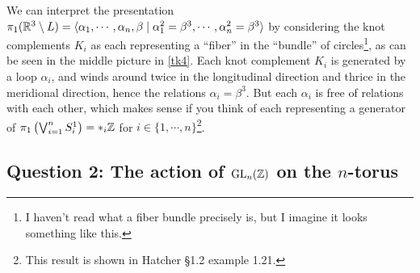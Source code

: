 \begin{solution}
We can interpret the presentation $\pi_1(\mathbb{R}^3 \setminus L)=\langle \alpha_1,\cdots ,\alpha _n  ,\beta \mid  \alpha_1^2=\beta ^3,\cdots ,\alpha _n ^2=\beta ^3\rangle $ by considering the knot complements $K_i $ as each representing a ``fiber'' in the ``bundle'' of circles\footnote{I haven't read what a fiber bundle precisely is, but I imagine it looks something like this.}, as can be seen in the middle picture in \cref{tk4}. Each knot complement $K_i $ is generated by a loop $\alpha _i $, and winds around twice in the longitudinal direction and thrice in the meridional direction, hence the relations $\alpha _i =\beta ^3$. But each $\alpha _i $ is free of relations with each other, which makes sense if you think of each representing a generator of $\pi_1\left( \bigvee _{i=1}^n S^1 _i  \right) =*_i \mathbb{Z}$ for $i\in \{1,\cdots ,n\} $\footnote{This result is shown in Hatcher \S 1.2 example 1.21.}.  \end{solution}

\subsection{Question 2: The action of $\operatorname{GL}_n (\mathbb{Z})$ on the $n$-torus}

